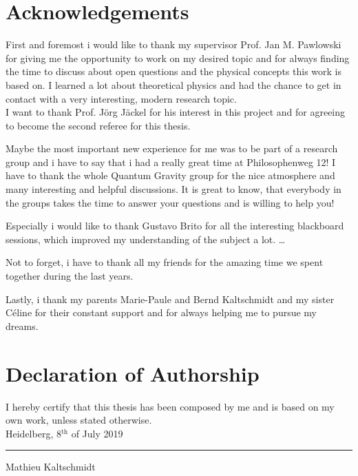 \thispagestyle{plain}
\section*{Acknowledgements}
First and foremost i would like to thank my supervisor Prof. Jan M. Pawlowski for giving me the opportunity to work on my desired topic and for always finding the time to discuss about open questions and the physical concepts this work is based on. I learned a lot about theoretical physics and had the chance to get in contact with a very interesting, modern research topic. \\

I want to thank Prof. J\"org J\"ackel for his interest in this project and for agreeing to become the second referee for this thesis.


Maybe the most important new experience for me was to be part of a research group and i have to say that i had a really great time at Philosophenweg 12! I have to thank the whole Quantum Gravity group for the nice atmosphere and many interesting and helpful discussions. It is great to know, that everybody in the groups takes the time to answer your questions and is willing to help you!  

  Especially i would like to thank Gustavo Brito for all the interesting blackboard sessions, which improved  my understanding of the subject a lot. \dots 


Not to forget, i have to thank all my friends for the amazing time we spent together during the last years.

Lastly, i thank my parents Marie-Paule and Bernd Kaltschmidt and my sister C\'{e}line for their constant support and for always helping me to pursue my dreams.  
 

\section*{Declaration of Authorship}
I hereby certify that this thesis has been composed by me and is based on my own work, unless stated otherwise.\\

Heidelberg, 8$^{\mathrm{th}}$ of July 2019 \hfill \rule{60mm}{.15mm} \par \vspace{-0.4cm}
\hfill Mathieu Kaltschmidt

